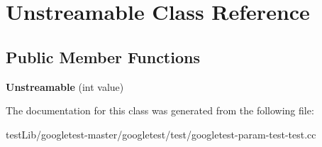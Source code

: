 \hypertarget{classUnstreamable}{}\section{Unstreamable Class Reference}
\label{classUnstreamable}
\subsection*{Public Member Functions}
\begin{DoxyCompactItemize}
\item 
\mbox{\label{classUnstreamable_aec8af0d0f78468a9094f1b36332a0842}} 
{\bfseries Unstreamable} (int value)
\end{DoxyCompactItemize}


The documentation for this class was generated from the following file\+:\begin{DoxyCompactItemize}
\item 
test\+Lib/googletest-\/master/googletest/test/googletest-\/param-\/test-\/test.\+cc\end{DoxyCompactItemize}
